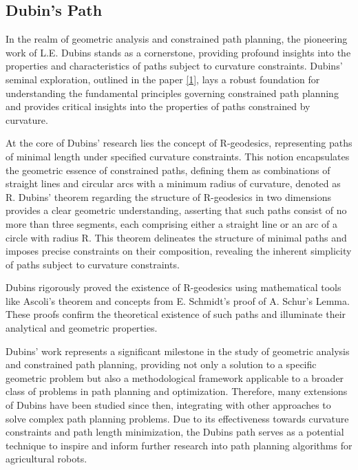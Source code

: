 \subsection{Dubin's Path}

In the realm of geometric analysis and constrained path planning, the pioneering work of L.E. Dubins stands as a cornerstone, providing profound insights into the properties and characteristics of paths subject to curvature constraints. Dubins' seminal exploration, outlined in the paper \hyperlink{cite.dubins}{[1]}, lays a robust foundation for understanding the fundamental principles governing constrained path planning and provides critical insights into the properties of paths constrained by curvature.

\vspace{3mm}

At the core of Dubins' research lies the concept of R-geodesics, representing paths of minimal length under specified curvature constraints. This notion encapsulates the geometric essence of constrained paths, defining them as combinations of straight lines and circular arcs with a minimum radius of curvature, denoted as R. Dubins' theorem regarding the structure of R-geodesics in two dimensions provides a clear geometric understanding, asserting that such paths consist of no more than three segments, each comprising either a straight line or an arc of a circle with radius R. This theorem delineates the structure of minimal paths and imposes precise constraints on their composition, revealing the inherent simplicity of paths subject to curvature constraints.

\vspace{3mm}

Dubins rigorously proved the existence of R-geodesics using mathematical tools like Ascoli's theorem and concepts from E. Schmidt's proof of A. Schur's Lemma. These proofs confirm the theoretical existence of such paths and illuminate their analytical and geometric properties.

\vspace{3mm}

Dubins' work represents a significant milestone in the study of geometric analysis and constrained path planning, providing not only a solution to a specific geometric problem but also a methodological framework applicable to a broader class of problems in path planning and optimization. Therefore, many extensions of Dubins have been studied since then, integrating with other approaches to solve complex path planning problems. Due to its effectiveness towards curvature constraints and path length minimization, the Dubins path serves as a potential technique to inspire and inform further research into path planning algorithms for agricultural robots.


